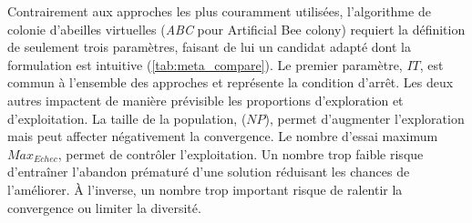 Contrairement aux approches les plus couramment utilisées, l’algorithme de
colonie d’abeilles virtuelles (\textit{ABC} pour Artificial Bee colony) requiert la
définition de seulement trois paramètres, faisant de lui un candidat adapté dont
la formulation est intuitive (\autoref{tab:meta_compare}). Le premier paramètre,
$IT$, est commun à l’ensemble des approches et représente la condition d’arrêt.
Les deux autres impactent de manière prévisible les proportions d’exploration et
d’exploitation. La taille de la population, ($NP$), permet d’augmenter
l’exploration mais peut affecter négativement la convergence. Le nombre
d’essai maximum $Max_{Echec}$, permet de contrôler l’exploitation. Un nombre
trop faible risque d’entraîner l’abandon prématuré d’une solution réduisant les chances de
l’améliorer. À l’inverse, un nombre trop important risque de ralentir la convergence
ou limiter la diversité.

